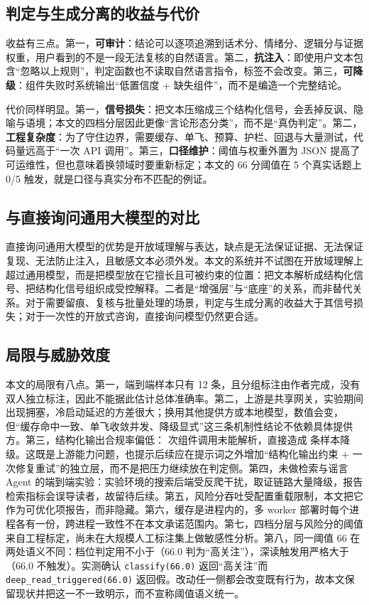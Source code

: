 \documentclass[12pt,a4paper,fontset=windows]{ctexart}
\begin{document}
\subsection{判定与生成分离的收益与代价}

收益有三点。第一，\textbf{可审计}：结论可以逐项追溯到话术分、情绪分、逻辑分与证据权重，用户看到的不是一段无法复核的自然语言。第二，\textbf{抗注入}：即使用户文本包含“忽略以上规则”，判定函数也不读取自然语言指令，标签不会改变。第三，\textbf{可降级}：组件失败时系统输出“低置信度 + 缺失组件”，而不是编造一个完整结论。

代价同样明显。第一，\textbf{信号损失}：把文本压缩成三个结构化信号，会丢掉反讽、隐喻与语境；本文的四档分层因此更像“言论形态分类”，而不是“真伪判定”。第二，\textbf{工程复杂度}：为了守住边界，需要缓存、单飞、预算、护栏、回退与大量测试，代码量远高于“一次 API 调用”。第三，\textbf{口径维护}：阈值与权重外置为 JSON 提高了可运维性，但也意味着换领域时要重新标定；本文的 66 分阈值在 5 个真实话题上 0/5 触发，就是口径与真实分布不匹配的例证。

\subsection{与直接询问通用大模型的对比}

直接询问通用大模型的优势是开放域理解与表达，缺点是无法保证证据、无法保证复现、无法防止注入，且敏感文本必须外发。本文的系统并不试图在开放域理解上超过通用模型，而是把模型放在它擅长且可被约束的位置：把文本解析成结构化信号、把结构化信号组织成受控解释。二者是“增强层”与“底座”的关系，而非替代关系。对于需要留痕、复核与批量处理的场景，判定与生成分离的收益大于其信号损失；对于一次性的开放式咨询，直接询问模型仍然更合适。

\subsection{局限与威胁效度}

本文的局限有八点。第一，端到端样本只有 12 条，且分组标注由作者完成，没有双人独立标注，因此不能据此估计总体准确率。第二，上游是共享网关，实验期间出现拥塞，冷启动延迟的方差很大；换用其他提供方或本地模型，数值会变，但“缓存命中一致、单飞收敛并发、降级显式”这三条机制性结论不依赖具体提供方。第三，结构化输出合规率偏低：\ApiCompFail{} 次组件调用未能解析，直接造成 \ApiDegraded{} 条样本降级。这既是上游能力问题，也提示后续应在提示词之外增加“结构化输出约束 + 一次修复重试”的独立层，而不是把压力继续放在判定侧。第四，未做检索与谣言 Agent 的端到端实验：实验环境的搜索后端受反爬干扰，取证链路大量降级，报告检索指标会误导读者，故留待后续。第五，风险分吞吐受配置重载限制，本文把它作为可优化项报告，而非隐藏。第六，缓存是进程内的，多 worker 部署时每个进程各有一份，跨进程一致性不在本文承诺范围内。第七，四档分层与风险分的阈值来自工程标定，尚未在大规模人工标注集上做敏感性分析。第八，同一阈值 66 在两处语义不同：档位判定用不小于（66.0 判为“高关注”），深读触发用严格大于（66.0 不触发）。实测确认 \texttt{classify(66.0)} 返回“高关注”而 \texttt{deep\_read\_triggered(66.0)} 返回假。改动任一侧都会改变既有行为，故本文保留现状并把这一不一致明示，而不宣称阈值语义统一。
\end{document}
